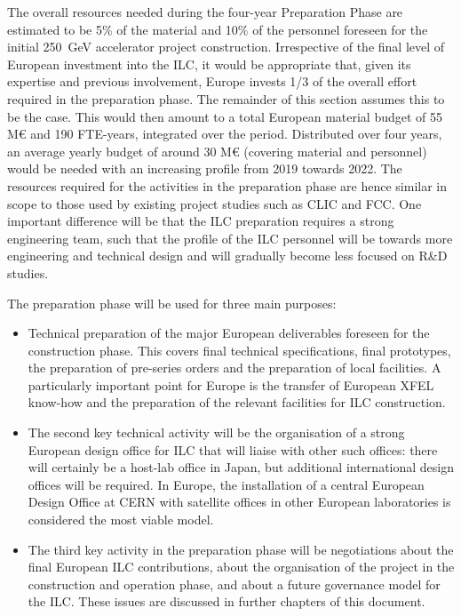 \documentclass[%
 reprint,
 floatfix,
 amsmath,amssymb,
 aps,
]{revtex4-1}
\begin{document}
The overall resources needed during the four-year Preparation Phase are estimated to be 5\% of the material and 10\% of the personnel 
foreseen for the initial 250~GeV accelerator project construction. Irrespective of the final level of European investment into the ILC,
it would be appropriate that, given its expertise and previous involvement, Europe invests 1/3 of the overall effort required in the 
preparation phase. The remainder of this section assumes this to be the case. This would then amount to a total European material 
budget of 55 M\euro{} and 190 FTE-years, integrated over the period.
Distributed over four years, an average yearly budget of around 30 M\euro{} (covering material and personnel) would be needed with an 
increasing profile from 2019 towards 2022. The resources required for the activities in the preparation phase are hence similar in 
scope to those used by existing project studies such as CLIC and FCC. One important difference will be that the ILC preparation 
requires a strong engineering team, such that the profile of the ILC personnel will be towards more engineering and technical 
design and will gradually become less focused on R\&D studies.

The preparation phase will be used for three main purposes:

\begin{itemize}
\item 
Technical preparation of the major European deliverables foreseen for the construction phase. 
This covers final technical specifications, final prototypes, the preparation of pre-series orders and the preparation of local 
facilities. A particularly important point for Europe is the transfer of European XFEL know-how and the preparation of the 
relevant facilities for ILC construction.
\item
The second key technical activity will be the organisation of a strong European design office for ILC that will liaise with 
other such offices: there will certainly be a host-lab office in Japan, but additional international design offices will be 
required. In Europe, the installation of a central European Design Office at CERN with satellite offices in other European laboratories is considered the most viable model.
\item 
The third key activity in the preparation phase will be negotiations about the final European ILC contributions, about the 
organisation of the project in the construction and operation phase, and about a future governance model for the ILC. 
These issues are discussed in further chapters of this document.
\end{itemize}
\end{document}
